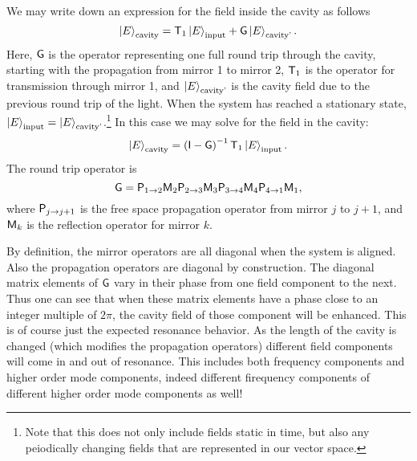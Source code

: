 We may write down an expression for the field inside the cavity as follows
\begin{equation}
\left| E \right>_{\text{cavity}} = \mathsf{T}_1\left| E \right>_{\text{input}}+\mathsf{G}\left| E \right>_{\text{cavity'}}.
\end{equation}
Here, $\mathsf{G}$ is the operator representing one full round trip through the cavity, starting with the propagation from mirror 1 to mirror 2, $\mathsf{T}_1$ is the operator for transmission through mirror 1, and $\left| E \right>_{\text{cavity'}}$ is the cavity field due to the previous round trip of the light. %
When the system has reached a stationary state, $\left| E \right>_{\text{input}}=\left| E \right>_{\text{cavity'}}$.\footnote{Note that this does not only include fields static in time, but also any peiodically changing fields that are represented in our vector space.} In this case we may solve for the field in the cavity:
\begin{equation}
\left| E \right>_{\text{cavity}} = \left(\mathsf{I}-\mathsf{G}\right)^{-1}\mathsf{T}_1\left| E \right>_{\text{input}}.
\end{equation}
The round trip operator is 
\begin{equation}
\mathsf{G} = \mathsf{P}_{1\rightarrow 2}\mathsf{M}_2\mathsf{P}_{2\rightarrow 3}\mathsf{M}_3\mathsf{P}_{3\rightarrow 4}\mathsf{M}_4\mathsf{P}_{4\rightarrow 1}\mathsf{M}_1,
\end{equation}
where $\mathsf{P}_{j\rightarrow j+1}$ is the free space propagation operator from mirror $j$ to $j+1$, and $\mathsf{M}_k$ is the reflection operator for mirror $k$.

By definition, the mirror operators are all diagonal when the system is aligned. %
Also the propagation operators are diagonal by construction. %
The diagonal matrix elements of $\mathsf{G}$ vary in their phase from one field component to the next. %
Thus one can see that when these matrix elements have a phase close to an integer multiple of $2\pi$, the cavity field of those component will be enhanced. %
This is of course just the expected resonance behavior. %
As the length of the cavity is changed (which modifies the propagation operators) different field components will come in and out of resonance. %
This includes both frequency components and higher order mode components, indeed different firequency components of different higher order mode components as well!

